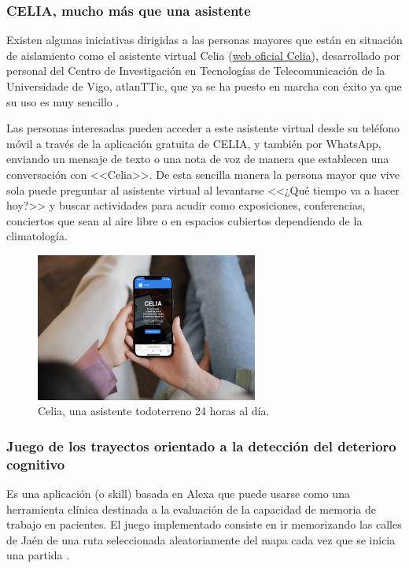 \subsubsection{CELIA, mucho más que una asistente}

Existen algunas iniciativas dirigidas a las personas mayores que están en situación de aislamiento como el asistente virtual Celia (\href{https://celiatecuida.com/}{web oficial Celia}), desarrollado por personal del Centro de Investigación en Tecnologías de Telecomunicación de la Universidade de Vigo, atlanTTic, que ya se ha puesto en marcha con éxito ya que su uso es muy sencillo \parencite{celia-app}.

Las personas interesadas pueden acceder a este asistente virtual desde su teléfono móvil a través de la aplicación gratuita de CELIA, y también por WhatsApp, enviando un mensaje de texto o una nota de voz de manera que establecen una conversación con <<Celia>>. De esta sencilla manera  la persona  mayor que vive sola puede preguntar al asistente virtual al levantarse <<¿Qué tiempo va a hacer hoy?>> y buscar actividades para acudir como exposiciones, conferencias, conciertos que sean al aire libre o en espacios cubiertos dependiendo de la climatología. 

\begin{figure}[ht]
    \centering
    \includegraphics[width=0.65\textwidth]{imgs/celia.jpg}
    \caption{Celia, una asistente todoterreno 24 horas al día.}
    \label{fig:celia}
\end{figure}

\subsubsection{Juego de los trayectos orientado a la detección del deterioro cognitivo}

Es una aplicación (o skill) basada en Alexa que puede usarse como una herramienta clínica destinada a la evaluación de la capacidad de memoria de trabajo en pacientes. El juego implementado consiste en ir memorizando las calles de Jaén de una ruta seleccionada aleatoriamente del mapa cada vez que se inicia una partida \parencite{tfgAlexa3}.

